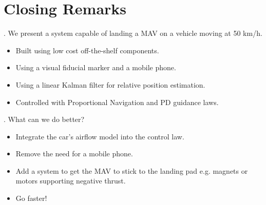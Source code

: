 \section{Closing Remarks}

\begin{frame}{\thesection. \insertsection}
	We present a system capable of landing a MAV on a vehicle moving at 50 km/h.
	\begin{itemize}
		\item Built using low cost off-the-shelf components.
		\item Using a visual fiducial marker and a mobile phone.
		\item Using a linear Kalman filter for relative position estimation.
		\item Controlled with Proportional Navigation and PD guidance laws.
	\end{itemize}
\end{frame}


\begin{frame}{\thesection. \insertsection}
	What can we do better?
	\begin{itemize}
		\item Integrate the car's airflow model into the control law.
		\item Remove the need for a mobile phone.
		\item Add a system to get the MAV to stick to the landing pad e.g. magnets or motors supporting negative thrust.
		\item Go faster!
	\end{itemize}
\end{frame}
